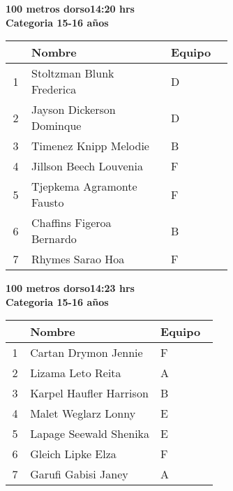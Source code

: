 \begin{minipage}{0.95\linewidth}\vspace{0.5cm} 
\begin{flushleft}
\textbf{
\hspace{-0.15cm}100 metros dorso\hspace{1.5cm}14:20 hrs \\Categoria 15-16 años}\vspace{-0.2cm} 
\end{flushleft}
\begin{tabular}{cp{0.63\linewidth}l}
\hline
& \textbf{Nombre} & \textbf{Equipo} \\ \hline
1 & Stoltzman Blunk Frederica & D \\ 
2 & Jayson Dickerson Dominque & D \\ 
3 & Timenez Knipp Melodie & B \\ 
4 & Jillson Beech Louvenia & F \\ 
5 & Tjepkema Agramonte Fausto & F \\ 
6 & Chaffins Figeroa Bernardo & B \\ 
7 & Rhymes Sarao Hoa & F \\ 
\end{tabular}
\end{minipage}
\begin{minipage}{0.95\linewidth}\vspace{0.5cm} 
\begin{flushleft}
\textbf{
\hspace{-0.15cm}100 metros dorso\hspace{1.5cm}14:23 hrs \\Categoria 15-16 años}\vspace{-0.2cm} 
\end{flushleft}
\begin{tabular}{cp{0.63\linewidth}l}
\hline
& \textbf{Nombre} & \textbf{Equipo} \\ \hline
1 & Cartan Drymon Jennie & F \\ 
2 & Lizama Leto Reita & A \\ 
3 & Karpel Haufler Harrison & B \\ 
4 & Malet Weglarz Lonny & E \\ 
5 & Lapage Seewald Shenika & E \\ 
6 & Gleich Lipke Elza & F \\ 
7 & Garufi Gabisi Janey & A \\ 
\end{tabular}
\end{minipage}
